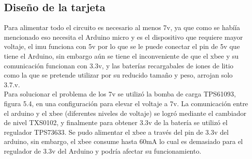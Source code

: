         \subsection{Diseño de la tarjeta}
        Para alimentar todo el circuito es necesario al menos 7v, ya que como se habíía mencionado eso necesita el Arduino micro y es el dispositivo que requiere mayor voltaje, el imu funciona con 5v por lo que se le puede conectar el pin de 5v que tiene el Arduino, sin embargo aún se tiene el inconveniente de que el xbee y su comunicación funcionan con 3.3v, y las baterías recargabales de iones de litio como la que se pretende utilizar por su reducido tamaño y peso, arrojan solo 3.7.v.\\
        Para solucionar el problema de los 7v se utilizó la bomba de carga TPS61093, figura 5.4, en una configuración para elevar el voltaje a 7v. La comunicación entre el arduino y el xbee (diferentes niveles de voltaje) se logró mediante el cambiador de nivel TXS0102, y finalmente para obtener 3.3v de la batería se utilizó el regulador TPS73633. Se pudo alimentar el xbee a través del pin de 3.3v del arduino, sin embargo, el xbee consume hasta 60mA lo cual es demasiado para el regulador de 3.3v del Arduino y podría afectar su funcionamiento.
        
